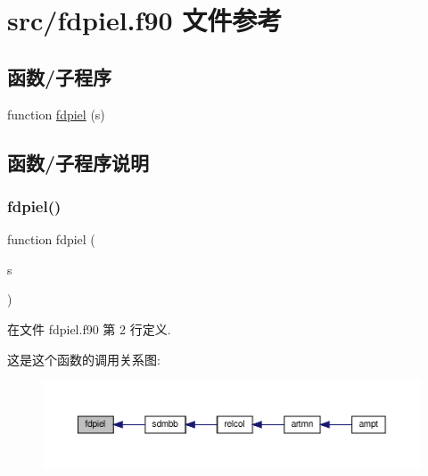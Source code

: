 \hypertarget{fdpiel_8f90}{}\section{src/fdpiel.f90 文件参考}
\label{fdpiel_8f90}
\subsection*{函数/子程序}
\begin{DoxyCompactItemize}
\item 
function \mbox{\hyperlink{fdpiel_8f90_adb68a8c1f20bba8df9301cc3057b9f93}{fdpiel}} (s)
\end{DoxyCompactItemize}


\subsection{函数/子程序说明}
\mbox{\label{fdpiel_8f90_adb68a8c1f20bba8df9301cc3057b9f93}} 
\subsubsection{\texorpdfstring{fdpiel()}{fdpiel()}}
{\footnotesize\ttfamily function fdpiel (\begin{DoxyParamCaption}\item[{}]{s }\end{DoxyParamCaption})}



在文件 fdpiel.\+f90 第 2 行定义.

这是这个函数的调用关系图\+:
\nopagebreak
\begin{figure}[H]
\begin{center}
\leavevmode
\includegraphics[width=350pt]{fdpiel_8f90_adb68a8c1f20bba8df9301cc3057b9f93_icgraph}
\end{center}
\end{figure}
